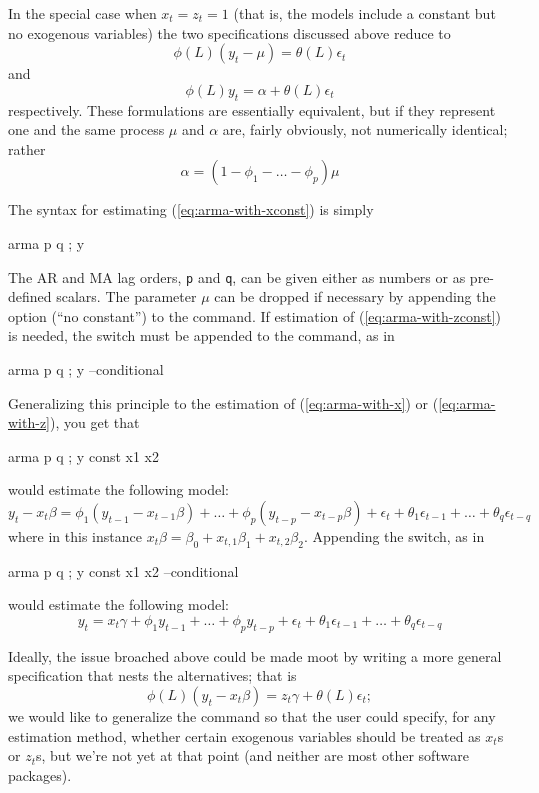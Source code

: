 In the special case when $x_t = z_t = 1$ (that is, the models include
a constant but no exogenous variables) the two specifications discussed
above reduce to
\begin{equation}
  \phi(L) (y_t - \mu) = \theta(L) \epsilon_t
  \label{eq:arma-with-xconst} 
\end{equation}
and
\begin{equation}
  \phi(L) y_t = \alpha + \theta(L) \epsilon_t
  \label{eq:arma-with-zconst}
\end{equation}
respectively.  These formulations are essentially equivalent, but if
they represent one and the same process $\mu$ and $\alpha$ are, fairly
obviously, not numerically identical; rather
\[
\alpha = \left(1 - \phi_1 - \ldots - \phi_p\right) \mu
\]

The  syntax for estimating (\ref{eq:arma-with-xconst}) is simply
\begin{code}
arma p q ; y
\end{code}
The AR and MA lag orders, \texttt{p} and \texttt{q}, can be given either as
numbers or as pre-defined scalars. The parameter $\mu$ can be dropped
if necessary by appending the option  (``no constant'') to
the command. If estimation of (\ref{eq:arma-with-zconst}) is needed,
the switch  must be appended to the command, as
in 
\begin{code}
arma p q ; y --conditional
\end{code}

Generalizing this principle to the estimation of
(\ref{eq:arma-with-x}) or (\ref{eq:arma-with-z}), you get that
\begin{code}
arma p q ; y const x1 x2
\end{code}
would estimate the following model:
\[
  y_t - x_t \beta = \phi_1 \left(y_{t-1} - x_{t-1} \beta \right) + \ldots + 
   \phi_p \left( y_{t-p} - x_{t-p} \beta \right) + 
  \epsilon_t + \theta_1 \epsilon_{t-1} + \ldots + \theta_q \epsilon_{t-q}
\]
where in this instance $x_t \beta = \beta_0 + x_{t,1} \beta_1 +
x_{t,2} \beta_2$. Appending the  switch, as in 
\begin{code}
arma p q ; y const x1 x2 --conditional
\end{code}
would estimate the following model:
\[
  y_t = x_t \gamma + \phi_1 y_{t-1} + \ldots +  \phi_p y_{t-p} + 
  \epsilon_t + \theta_1 \epsilon_{t-1} + \ldots + \theta_q \epsilon_{t-q}
\]

Ideally, the issue broached above could be made moot by writing a more
general specification that nests the alternatives; that is
\begin{equation}
 \label{armax-general}
  \phi(L) \left(y_t - x_t \beta\right) = z_t \gamma  + \theta(L) \epsilon_t ;
\end{equation}
we would like to generalize the  command so that
the user could specify, for any estimation method, whether certain
exogenous variables should be treated as $x_t$s or $z_t$s, but we're
not yet at that point (and neither are most other software packages).


